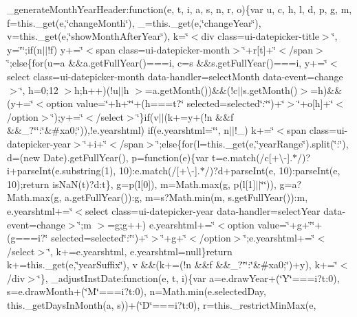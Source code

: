 \begin{DoxyCompactItemize}
\+\_\+generate\+Month\+Year\+Header\+:function(e, t, i, a, s, n, r, o)\{var u, c, h, l, d, p, g, m, f=this.\+\_\+get(e,\char`\"{}change\+Month\char`\"{}), \+\_\+=this.\+\_\+get(e,\char`\"{}change\+Year\char`\"{}), v=this.\+\_\+get(e,\char`\"{}show\+Month\+After\+Year\char`\"{}), k=\char`\"{}$<$div class=\textquotesingle{}ui-\/datepicker-\/title\textquotesingle{}$>$\char`\"{}, y=\char`\"{}\char`\"{};if(n$\vert$$\vert$!f) y+=\char`\"{}$<$span class=\textquotesingle{}ui-\/datepicker-\/month\textquotesingle{}$>$\char`\"{}+r\mbox{[}t\mbox{]}+\char`\"{}$<$/span$>$\char`\"{};else\{for(u=a \&\&a.\+get\+Full\+Year()===i, c=s \&\&s.\+get\+Full\+Year()===i, y+=\char`\"{}$<$select class=\textquotesingle{}ui-\/datepicker-\/month\textquotesingle{} data-\/handler=\textquotesingle{}select\+Month\textquotesingle{} data-\/event=\textquotesingle{}change\textquotesingle{}$>$\char`\"{}, h=0;12 $>$h;h++)(!u$\vert$$\vert$h $>$=a.\+get\+Month())\&\&(!c$\vert$$\vert$s.\+get\+Month()$>$=h)\&\&(y+=\char`\"{}$<$option value=\textquotesingle{}\char`\"{}+h+\char`\"{}\textquotesingle{}\char`\"{}+(h===t?\char`\"{} selected=\textquotesingle{}selected\textquotesingle{}\char`\"{}\+:\char`\"{}\char`\"{})+\char`\"{}$>$\char`\"{}+o\mbox{[}h\mbox{]}+\char`\"{}$<$/option$>$\char`\"{});y+=\char`\"{}$<$/select$>$\char`\"{}\}if(v$\vert$$\vert$(k+=y+(!n \&\&f \&\&\+\_\+?\char`\"{}\char`\"{}\+:\char`\"{}\&\#xa0;\char`\"{})),!e.\+yearshtml) if(e.\+yearshtml=\char`\"{}\char`\"{}, n$\vert$$\vert$!\+\_\+) k+=\char`\"{}$<$span class=\textquotesingle{}ui-\/datepicker-\/year\textquotesingle{}$>$\char`\"{}+i+\char`\"{}$<$/span$>$\char`\"{};else\{for(l=this.\+\_\+get(e,\char`\"{}year\+Range\char`\"{}).\+split(\char`\"{}\+:\char`\"{}), d=(new Date).\+get\+Full\+Year(), p=function(e)\{var t=e.\+match(/c\mbox{[}+\textbackslash{}-\/\mbox{]}.$\ast$/)?i+parse\+Int(e.\+substring(1), 10)\+:e.\+match(/\mbox{[}+\textbackslash{}-\/\mbox{]}.$\ast$/)?d+parse\+Int(e, 10)\+:parse\+Int(e, 10);return is\+Na\+N(t)?d\+:t\}, g=p(l\mbox{[}0\mbox{]}), m=\+Math.\+max(g, p(l\mbox{[}1\mbox{]}$\vert$$\vert$\char`\"{}\char`\"{})), g=a?\+Math.\+max(g, a.\+get\+Full\+Year())\+:g, m=s?\+Math.\+min(m, s.\+get\+Full\+Year())\+:m, e.\+yearshtml+=\char`\"{}$<$select class=\textquotesingle{}ui-\/datepicker-\/year\textquotesingle{} data-\/handler=\textquotesingle{}select\+Year\textquotesingle{} data-\/event=\textquotesingle{}change\textquotesingle{}$>$\char`\"{};m $>$=g;g++) e.\+yearshtml+=\char`\"{}$<$option value=\textquotesingle{}\char`\"{}+g+\char`\"{}\textquotesingle{}\char`\"{}+(g===i?\char`\"{} selected=\textquotesingle{}selected\textquotesingle{}\char`\"{}\+:\char`\"{}\char`\"{})+\char`\"{}$>$\char`\"{}+g+\char`\"{}$<$/option$>$\char`\"{};e.\+yearshtml+=\char`\"{}$<$/select$>$\char`\"{}, k+=e.\+yearshtml, e.\+yearshtml=null\}return k+=this.\+\_\+get(e,\char`\"{}year\+Suffix\char`\"{}), v \&\&(k+=(!n \&\&f \&\&\+\_\+?\char`\"{}\char`\"{}\+:\char`\"{}\&\#xa0;\char`\"{})+y), k+=\char`\"{}$<$/div$>$\char`\"{}\}, \+\_\+adjust\+Inst\+Date\+:function(e, t, i)\{var a=e.\+draw\+Year+(\char`\"{}\+Y\char`\"{}===i?t\+:0), s=e.\+draw\+Month+(\char`\"{}\+M\char`\"{}===i?t\+:0), n=\+Math.\+min(e.\+selected\+Day, this.\+\_\+get\+Days\+In\+Month(a, s))+(\char`\"{}\+D\char`\"{}===i?t\+:0), r=this.\+\_\+restrict\+Min\+Max(e, 
\end{DoxyCompactItemize}
